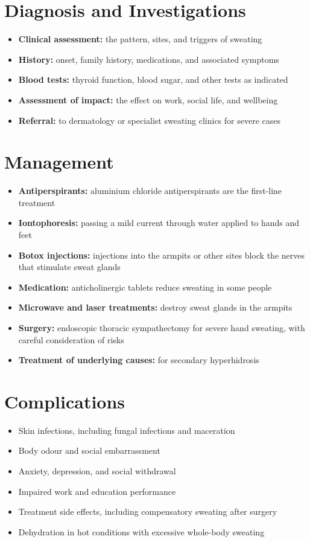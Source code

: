 \section*{Diagnosis and Investigations}
\begin{itemize}
    \item \textbf{Clinical assessment:} the pattern, sites, and triggers of sweating
    \item \textbf{History:} onset, family history, medications, and associated symptoms
    \item \textbf{Blood tests:} thyroid function, blood sugar, and other tests as indicated
    \item \textbf{Assessment of impact:} the effect on work, social life, and wellbeing
    \item \textbf{Referral:} to dermatology or specialist sweating clinics for severe cases
\end{itemize}

\section*{Management}
\begin{itemize}
    \item \textbf{Antiperspirants:} aluminium chloride antiperspirants are the first-line treatment
    \item \textbf{Iontophoresis:} passing a mild current through water applied to hands and feet
    \item \textbf{Botox injections:} injections into the armpits or other sites block the nerves that stimulate sweat glands
    \item \textbf{Medication:} anticholinergic tablets reduce sweating in some people
    \item \textbf{Microwave and laser treatments:} destroy sweat glands in the armpits
    \item \textbf{Surgery:} endoscopic thoracic sympathectomy for severe hand sweating, with careful consideration of risks
    \item \textbf{Treatment of underlying causes:} for secondary hyperhidrosis
\end{itemize}

\section*{Complications}
\begin{itemize}
    \item Skin infections, including fungal infections and maceration
    \item Body odour and social embarrassment
    \item Anxiety, depression, and social withdrawal
    \item Impaired work and education performance
    \item Treatment side effects, including compensatory sweating after surgery
    \item Dehydration in hot conditions with excessive whole-body sweating
\end{itemize}

